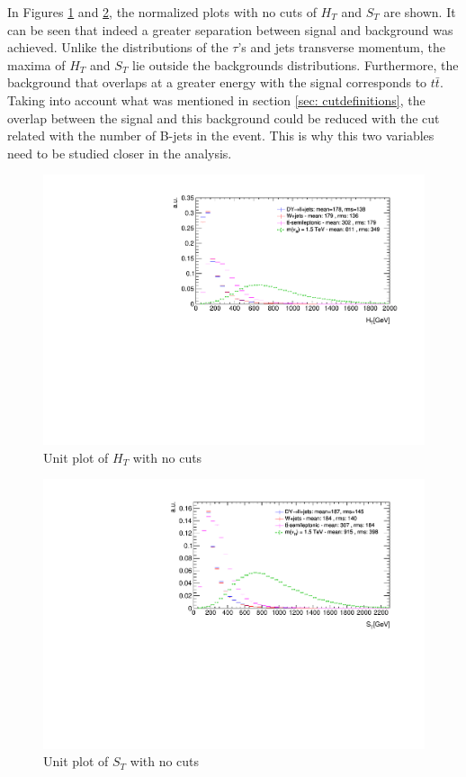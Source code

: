 In Figures \ref{fig: HTunitNC} and \ref{fig: STunitNC}, the normalized plots with no cuts of $H_{T}$ and $S_{T}$ are shown. It can be seen that indeed a greater separation between signal and background was achieved. Unlike the distributions of the $\tau$'s and jets transverse momentum, the maxima of $H_{T}$ and $S_{T}$ lie outside the backgrounds distributions. Furthermore, the background that overlaps at a greater energy with the signal corresponds to $t\bar{t}$. Taking into account what was mentioned in section \ref{sec: cutdefinitions}, the overlap between the signal and this background could be reduced with the cut related with the number of B-jets in the event. This is why this two variables need to be studied closer in the analysis.

\begin{figure}
\includegraphics[width=\linewidth]{Plots/HT_unitNC.pdf}
\caption{Unit plot of $H_{T}$ with no cuts}
\label{fig: HTunitNC}
\end{figure}

\begin{figure}
\centering
\includegraphics[width=\linewidth]{Plots/ST_unitNC.pdf}
\caption{Unit plot of $S_{T}$ with no cuts}
\label{fig: STunitNC}
\end{figure}

